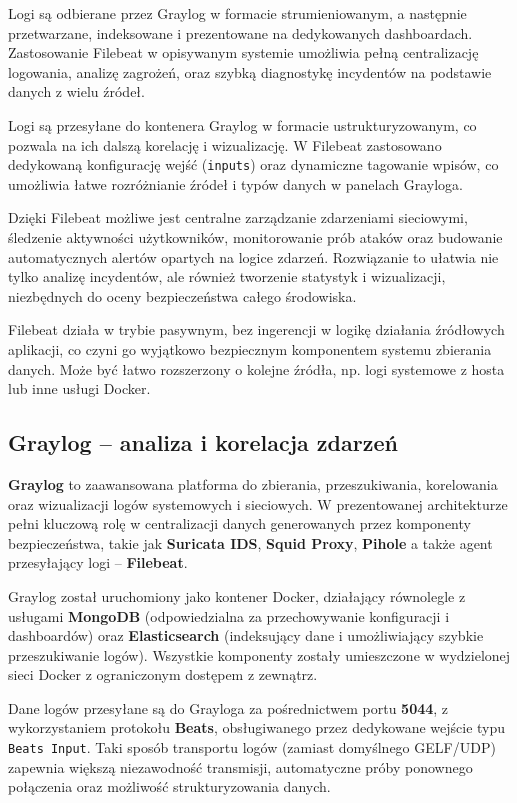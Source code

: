 \documentclass[
    left=2.5cm,         %
    right=2.5cm,        %
    top=2.5cm,          %
    bottom=3cm,         %
    bindingoffset=6mm,  %
    nohyphenation=true %
]{eiti/eiti-thesis} %
\begin{document}
Logi są odbierane przez Graylog w formacie strumieniowanym, a następnie przetwarzane, indeksowane i prezentowane na dedykowanych dashboardach. Zastosowanie Filebeat w opisywanym systemie umożliwia pełną centralizację logowania, analizę zagrożeń, oraz szybką diagnostykę incydentów na podstawie danych z wielu źródeł.



Logi są przesyłane do kontenera Graylog w formacie ustrukturyzowanym, co pozwala na ich dalszą korelację i wizualizację. W Filebeat zastosowano dedykowaną konfigurację wejść (\texttt{inputs}) oraz dynamiczne tagowanie wpisów, co umożliwia łatwe rozróżnianie źródeł i typów danych w panelach Grayloga.

Dzięki Filebeat możliwe jest centralne zarządzanie zdarzeniami sieciowymi, śledzenie aktywności użytkowników, monitorowanie prób ataków oraz budowanie automatycznych alertów opartych na logice zdarzeń. Rozwiązanie to ułatwia nie tylko analizę incydentów, ale również tworzenie statystyk i wizualizacji, niezbędnych do oceny bezpieczeństwa całego środowiska.

Filebeat działa w trybie pasywnym, bez ingerencji w logikę działania źródłowych aplikacji, co czyni go wyjątkowo bezpiecznym komponentem systemu zbierania danych. Może być łatwo rozszerzony o kolejne źródła, np. logi systemowe z hosta lub inne usługi Docker.

\subsection{Graylog – analiza i korelacja zdarzeń}

\textbf{Graylog}\cite{graylog-docs} to zaawansowana platforma do zbierania, przeszukiwania, korelowania oraz wizualizacji logów systemowych i sieciowych. W prezentowanej architekturze pełni kluczową rolę w centralizacji danych generowanych przez komponenty bezpieczeństwa, takie jak \textbf{Suricata IDS}, \textbf{Squid Proxy}, \textbf{Pihole} a także agent przesyłający logi – \textbf{Filebeat}.

Graylog został uruchomiony jako kontener Docker, działający równolegle z usługami \textbf{MongoDB} (odpowiedzialna za przechowywanie konfiguracji i dashboardów) oraz \textbf{Elasticsearch} (indeksujący dane i umożliwiający szybkie przeszukiwanie logów). Wszystkie komponenty zostały umieszczone w wydzielonej sieci Docker z ograniczonym dostępem z zewnątrz.

Dane logów przesyłane są do Grayloga za pośrednictwem portu \textbf{5044}, z wykorzystaniem protokołu \textbf{Beats}, obsługiwanego przez dedykowane wejście typu \texttt{Beats Input}. Taki sposób transportu logów (zamiast domyślnego GELF/UDP) zapewnia większą niezawodność transmisji, automatyczne próby ponownego połączenia oraz możliwość strukturyzowania danych.
\end{document}
